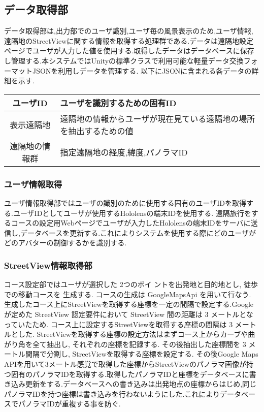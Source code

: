 \subsection{データ取得部}
データ取得部は,出力部でのユーザ識別,ユーザ毎の風景表示のため,ユーザ情報,遠隔地のStreetViewに関する情報を取得する処理群である.データは遠隔地設定ページでユーザが入力した値を使用する.取得したデータはデータベースに保存し管理する.本システムではUnityの標準クラスで利用可能な軽量データ交換フォーマットJSONを利用しデータを管理する\cite{json}.
以下にJSONに含まれる各データの詳細を示す.

\begin{table}[ht]
  \begin{tabular}{| c | l |}
  \hline
    ユーザID & ユーザを識別するための固有ID \\ \hline
    表示遠隔地 & 遠隔地の情報からユーザが現在見ている遠隔地の場所を抽出するための値\\ \hline
    遠隔地の情報群 & 指定遠隔地の経度,緯度,パノラマID \\ \hline
  \end{tabular}
\end{table}

\clearpage

\subsubsection{ユーザ情報取得}
ユーザ情報取得部ではユーザの識別のために使用する固有のユーザIDを取得する.ユーザIDとしてユーザが使用するHololensの端末IDを使用する. 遠隔旅行をするコースの設定用Webページでユーザが入力したHololensの端末IDをサーバに送信し,データベースを更新する.これによりシステムを使用する際にどのユーザがどのアバターの制御するかを識別する.

\clearpage

\subsubsection{StreetView情報取得部}
コース設定部ではユーザが選択した 2つのポイ ントを出発地と目的地とし, 徒歩での移動コースを 生成する. コースの生成は GoogleMapsApi を用いて行なう\cite{googlemapsapi}. 
生成したコース上にStreetViewを取得する座標を一定の間隔で設定する.Google が定めた StreetView 認定要件において StreetView 間の距離は 3 メートルとなっていたため\cite{svrule}. コース上に設定するStreetViewを取得する座標の間隔は 3 メートルとした. StreetViewを取得する座標の設定方法はまずコース上からカーブや曲がり角を全て抽出し, それぞれの座標を記録する. その後抽出した座標間を 3 メートル間隔で分割し, StreetViewを取得する座標を設定する. 
その後Google Maps APIを用いて3メートル感覚で取得した座標からStreetViewのパノラマ画像が持つ固有のパノラマIDを取得する.取得したパノラマIDと座標をデータベースに書き込み更新をする.データベースへの書き込みは出発地点の座標からはじめ,同じパノラマIDを持つ座標は書き込みを行わないようにした.これによりデータベースでパノラマIDが重複する事を防ぐ.






